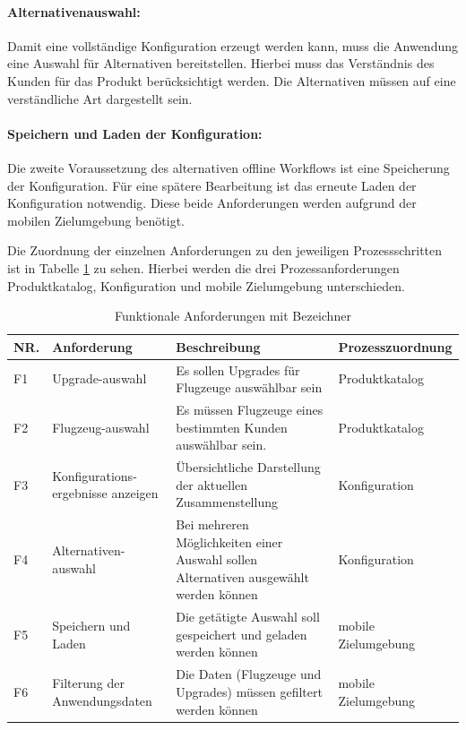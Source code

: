\paragraph{Alternativenauswahl: } Damit eine vollständige Konfiguration erzeugt werden kann, muss die Anwendung eine Auswahl für Alternativen bereitstellen. Hierbei muss das Verständnis des Kunden für das Produkt berücksichtigt werden. Die Alternativen müssen auf eine verständliche Art dargestellt sein. 

\paragraph{Speichern und Laden der Konfiguration: } Die zweite Voraussetzung des alternativen offline Workflows ist eine Speicherung der Konfiguration. Für eine spätere Bearbeitung ist das erneute Laden der Konfiguration notwendig. Diese beide Anforderungen werden aufgrund der mobilen Zielumgebung benötigt.

Die Zuordnung der einzelnen Anforderungen zu den jeweiligen Prozessschritten ist in Tabelle \ref{functionalRequirements} zu sehen. Hierbei werden die drei Prozessanforderungen Produktkatalog, Konfiguration und mobile Zielumgebung unterschieden.
\par 
\begin{table}

\begin{tabular}[H]{| p{0.4cm} | p{2.5cm} | p{5.9cm} | p{4.5cm} |}
\toprule[2pt] \rowcolor{dunkelgrau}
\hline
  NR. & Anforderung & Beschreibung & Prozesszuordnung \\
  \hline
  F1 & Upgrade-auswahl & Es sollen Upgrades für Flugzeuge auswählbar sein & Produktkatalog
   \\
  \hline
  F2 & Flugzeug-auswahl & Es müssen Flugzeuge eines bestimmten Kunden auswählbar sein. & Produktkatalog  \\
  \hline
    F3 & Konfigurations-ergebnisse anzeigen & Übersichtliche Darstellung der aktuellen Zusammenstellung & Konfiguration \\
    \hline
     F4 & Alternativen-auswahl & Bei mehreren Möglichkeiten einer Auswahl sollen Alternativen ausgewählt werden können & Konfiguration \\
        \hline
    F5 & Speichern und Laden & Die getätigte Auswahl soll gespeichert und geladen werden können& mobile Zielumgebung \\
    \hline
    F6 & Filterung der Anwendungsdaten & Die Daten (Flugzeuge und Upgrades) müssen gefiltert werden können & mobile Zielumgebung \\
    \hline
\bottomrule[2pt]
\end{tabular}
\caption{Funktionale Anforderungen mit Bezeichner}
\label{functionalRequirements}
\end{table}





